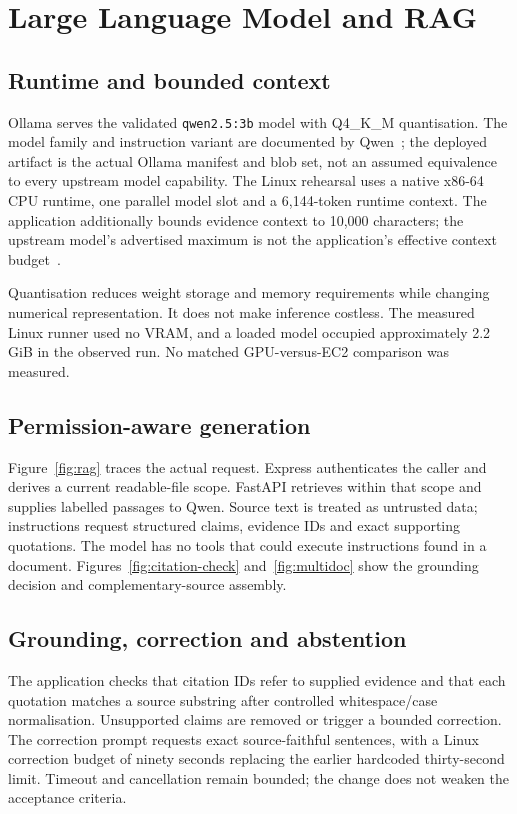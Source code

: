 \chapter{Large Language Model and RAG}
\section{Runtime and bounded context}
Ollama serves the validated \texttt{qwen2.5:3b} model with Q4\_K\_M quantisation. The model family and instruction variant are documented by Qwen~\cite{qwen}; the deployed artifact is the actual Ollama manifest and blob set, not an assumed equivalence to every upstream model capability. The Linux rehearsal uses a native x86-64 CPU runtime, one parallel model slot and a 6,144-token runtime context. The application additionally bounds evidence context to 10,000 characters; the upstream model's advertised maximum is not the application's effective context budget~\cite{ollama}.

Quantisation reduces weight storage and memory requirements while changing numerical representation. It does not make inference costless. The measured Linux runner used no VRAM, and a loaded model occupied approximately 2.2 GiB in the observed run. No matched GPU-versus-EC2 comparison was measured.
\section{Permission-aware generation}
Figure~\ref{fig:rag} traces the actual request. Express authenticates the caller and derives a current readable-file scope. FastAPI retrieves within that scope and supplies labelled passages to Qwen. Source text is treated as untrusted data; instructions request structured claims, evidence IDs and exact supporting quotations. The model has no tools that could execute instructions found in a document.
Figures~\ref{fig:citation-check} and~\ref{fig:multidoc} show the grounding decision and complementary-source assembly.
\section{Grounding, correction and abstention}
The application checks that citation IDs refer to supplied evidence and that each quotation matches a source substring after controlled whitespace/case normalisation. Unsupported claims are removed or trigger a bounded correction. The correction prompt requests exact source-faithful sentences, with a Linux correction budget of ninety seconds replacing the earlier hardcoded thirty-second limit. Timeout and cancellation remain bounded; the change does not weaken the acceptance criteria.

